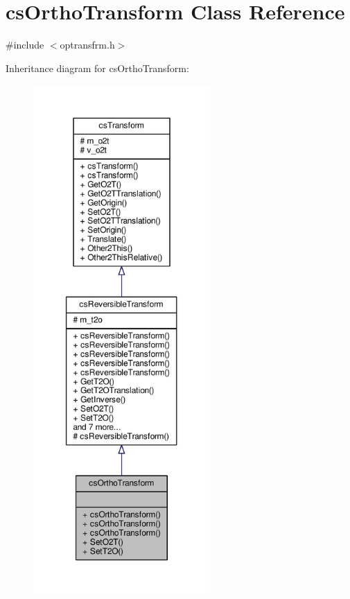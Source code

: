 \hypertarget{classcsOrthoTransform}{}\section{cs\+Ortho\+Transform Class Reference}
\label{classcsOrthoTransform}


{\ttfamily \#include $<$optransfrm.\+h$>$}



Inheritance diagram for cs\+Ortho\+Transform\+:
\nopagebreak
\begin{figure}[H]
\begin{center}
\leavevmode
\includegraphics[height=550pt]{d9/daf/classcsOrthoTransform__inherit__graph}
\end{center}
\end{figure}


